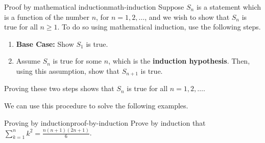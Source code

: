 \begin{procedure}{Proof by mathematical induction}{math-induction}
Suppose $S_{n}$ is a statement which is a function of the number $n$, for $n=1,2,\ldots$, and
we wish to show that $S_{n}$ is true for all $n \geq 1$. To do so using mathematical induction, use the
following steps.
\begin{enumerate}
\item \textbf{Base Case:} Show $S_{1}$ is true.

\item Assume $S_{n}$ is true for some $n$, which is the \textbf{induction hypothesis}. Then, using this assumption,
show that $S_{n+1}$ is true.
\end{enumerate}

Proving these two steps shows that $S_{n}$ is true for all $n = 1,2,\ldots$.
\end{procedure}

We can use this procedure to solve the following examples.

\begin{example}{Proving by induction}{proof-by-induction}
Prove by induction that $\sum_{k=1}^{n}k^{2}=\displaystyle
\frac{n(n+1) (2n+1) }{6}$.
\end{example}

